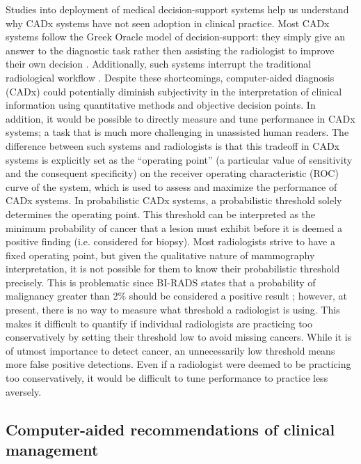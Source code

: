 Studies into deployment of medical decision-support systems help us understand why CADx systems have not seen adoption in clinical practice. Most CADx systems follow the Greek Oracle model of decision-support: they simply give an answer to the diagnostic task rather then assisting the radiologist to improve their own decision \cite{Miller:1990wg, Friedman:2009dx, Bright:2012ga}. Additionally, such systems interrupt the traditional radiological workflow \cite{Morgan:2011ct}. Despite these shortcomings, computer-aided diagnosis (CADx) could potentially diminish subjectivity in the interpretation of clinical information using quantitative methods and objective decision points. In addition, it would be possible to directly measure and tune performance in CADx systems; a task that is much more challenging in unassisted human readers. The difference between such systems and radiologists is that this tradeoff in CADx systems is explicitly set as the “operating point” (a particular value of sensitivity and the consequent specificity) on the receiver operating characteristic (ROC) curve of the system, which is used to assess and maximize the performance of CADx systems. In probabilistic CADx systems, a probabilistic threshold solely determines the operating point. This threshold can be interpreted as the minimum probability of cancer that a lesion must exhibit before it is deemed a positive finding (i.e. considered for biopsy). Most radiologists strive to have a fixed operating point, but given the qualitative nature of mammography interpretation, it is not possible for them to know their probabilistic threshold precisely. This is problematic since BI-RADS states that a probability of malignancy greater than 2\% should be considered a positive result \cite{Liberman:ws,Liberman:2002gg}; however, at present, there is no way to measure what threshold a radiologist is using. This makes it difficult to quantify if individual radiologists are practicing too conservatively by setting their threshold low to avoid missing cancers. While it is of utmost importance to detect cancer, an unnecessarily low threshold means more false positive detections. Even if a radiologist were deemed to be practicing too conservatively, it would be difficult to tune performance to practice less aversely.
\subsection{Computer-aided recommendations of clinical management}













